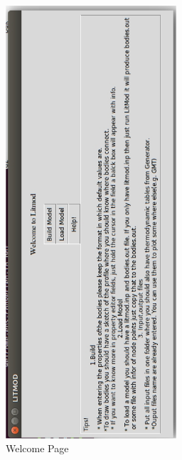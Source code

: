 \documentclass[12pt]{article}
\begin{document}
\begin{figure}
\centering \includegraphics[width=15pc,angle=-90]{./welcome.eps}
\caption{Welcome Page}
\label{welcome}
\end{figure}
\end{document}
